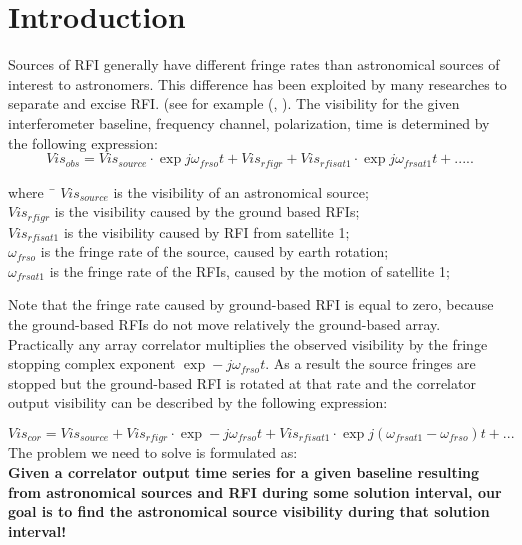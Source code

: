\documentclass{article}
\begin{document}
\section{Introduction}
Sources of RFI generally have different fringe rates than astronomical
sources of interest to astronomers. This
difference has been exploited by many researches to separate and
excise RFI. (see for example (\cite{cor}, \cite{per}).
The visibility for the given interferometer baseline, frequency
channel, polarization, time is determined by the following expression:
\begin{equation}
        Vis_{obs} = Vis_{source} \cdot \exp j \omega_{frso} t + Vis_{rfigr}  + Vis_{rfisat1} \cdot \exp j \omega_{frsat1} t + .....
        \label{eq:visobs}
\end{equation}
\begin{tabbing}
where~  \=  $Vis_{source}$ is the visibility of an astronomical source; \\
        \>  $Vis_{rfigr}$ is the visibility
            caused by the ground based RFIs; \\
        \>  $Vis_{rfisat1}$ is the visibility
            caused by  RFI from satellite 1; \\
        \>  $ \omega_{frso}$ is the fringe rate of the source, caused
            by earth rotation; \\
        \>  $ \omega_{frsat1}$ is the fringe rate of the RFIs, caused
            by the motion of  satellite 1; \\
\end{tabbing}
Note that the fringe rate caused by ground-based RFI is equal
to zero, because the ground-based RFIs do not move relatively the
ground-based array.\\
Practically any array correlator multiplies the observed visibility by
the fringe stopping complex exponent $\exp -j \omega_{frso}t$. As a
result  the source fringes are stopped but the ground-based RFI is
rotated at that rate and the correlator output visibility can be
described by the following expression:

\begin{equation}
        Vis_{cor} = Vis_{source} + Vis_{rfigr} \cdot \exp -j \omega_{frso} t  + Vis_{rfisat1} \cdot \exp j (\omega_{frsat1}-\omega_{frso}) t + ...
        \label{eq:viscor}
\end{equation}
The problem we need to solve is formulated as:\\
{\bf Given a correlator output time series for a given baseline
  resulting from astronomical sources and RFI during some solution
  interval, our goal is to find the astronomical source visibility during that solution interval!}
\end{document}

